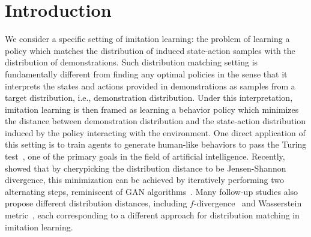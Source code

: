 \section{Introduction}

We consider a specific setting of imitation learning:
the problem of learning a policy which matches the distribution of induced state-action samples with the distribution of demonstrations. 
Such distribution matching setting is fundamentally different from finding any optimal policies in the sense that it interprets the states and actions provided in demonstrations as samples from a target distribution, i.e., demonstration distribution.
Under this interpretation, imitation learning is then framed as learning a behavior policy which minimizes the distance between demonstration distribution and the state-action distribution induced by the policy interacting with the environment. 
One direct application of this setting is to train agents to generate human-like behaviors to pass the Turing test~\citep{saygin2000turing}, one of the primary goals in the field of artificial intelligence. 
Recently, \citet{ho2016generative} showed that by cherypicking the distribution distance to be Jensen-Shannon divergence, this minimization can be achieved by iteratively performing two alternating steps, reminiscent of GAN algorithms~\citep{goodfellow2014generative}. 
Many follow-up studies also propose different distribution distances, including $f$-divergence~\citep{ke2019imitation} and Wasserstein metric~\citep{xiao2019wasserstein}, each corresponding to a different approach for distribution matching in imitation learning. 



